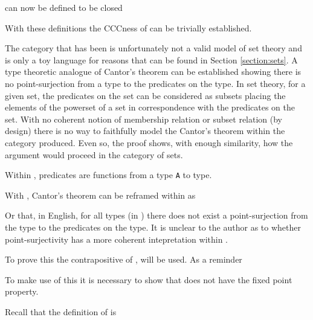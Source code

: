 
 can now be defined to be closed

With these definitions the CCCness of  can be trivially
established.

The category that has been is unfortunately not a valid model of set theory and
is only a toy language for reasons that can be found in Section
\ref{section:sets}.  A type theoretic analogue of Cantor's theorem can be
established showing there is no point-surjection from a type to the predicates
on the type. In set theory, for a given set, the predicates on the set can be
considered as subsets placing the elements of the powerset of a set in
correspondence with the predicates on the set. With no coherent notion of
membership relation or subset relation (by design) there is no way to faithfully
model the Cantor's theorem  within the category produced. Even so, the proof
shows, with enough similarity, how the argument would proceed in the category of
sets.

Within , predicates are functions from a type \verb|A| to
 type.


With , Cantor's theorem can be reframed within
 as


Or that, in English, for all types (in ) there does not exist
a point-surjection from the type to the predicates on the type. It is unclear
to the author as to whether point-surjectivity has a more coherent intepretation
within .

To prove this  the contrapositive of
,  will be used. As a reminder


To make use of this it is necessary to show that  does not
have the fixed point property.


Recall that the definition of  is

